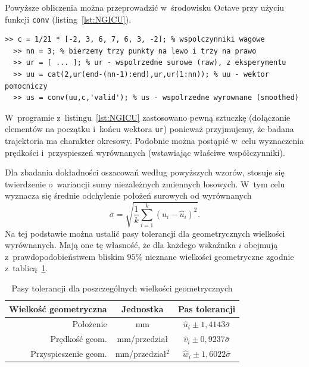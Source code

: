 \documentclass[paper=a4,DIV=12]{tmmlab}
\begin{document}
Powyższe obliczenia można przeprowadzić w~środowisku Octave przy użyciu funkcji
\lstinline{conv} (listing~\ref{lst:NGICU}).
\begin{lstlisting}[caption={Wyrównywanie współrzędnych w~programie Octave},label={lst:NGICU}]
  >> c = 1/21 * [-2, 3, 6, 7, 6, 3, -2]; % wspolczynniki wagowe
  >> nn = 3; % bierzemy trzy punkty na lewo i trzy na prawo
  >> ur = [ ... ]; % ur - wspolrzedne surowe (raw), z eksperymentu
  >> uu = cat(2,ur(end-(nn-1):end),ur,ur(1:nn)); % uu - wektor pomocniczy
  >> us = conv(uu,c,'valid'); % us - wspolrzedne wyrownane (smoothed)
\end{lstlisting}
W~programie z~listingu~\ref{lst:NGICU} zastosowano pewną sztuczkę
(dołączanie elementów na początku i~końcu wektora \lstinline{ur}) ponieważ
przyjmujemy, że badana trajektoria ma charakter okresowy. Podobnie można
postąpić w~celu wyznaczenia prędkości i~przyspieszeń wyrównanych (wstawiając
właściwe współczynniki).

Dla zbadania dokładności oszacowań według powyższych wzorów, stosuje się
twierdzenie o~wariancji sumy niezależnych zmiennych losowych. W~tym celu
wyznacza się średnie odchylenie położeń surowych od wyrównanych
\begin{equation}
  \bar{\sigma} = {\sqrt{\frac{1}{k} \sum_{i=1}^{k}{\left(u_i - \hat{u}_i\right)^2}}}.
  \label{eq:7Q65O}
\end{equation}
Na tej podstawie można ustalić pasy tolerancji dla geometrycznych wielkości
wyrównanych. Mają one tę własność, że dla każdego wskaźnika $i$ obejmują
z~prawdopodobieństwem bliskim $95\%$  nieznane wielkości geometryczne zgodnie
z~tablicą~\ref{tab:IKYIL}.
\begin{table}[htbp]
  \caption{Pasy tolerancji dla poszczególnych wielkości geometrycznych}
  \label{tab:IKYIL}
  \centering
  \begin{tabular}{|r|c|c|}
    \hline
    Wielkość geometryczna & Jednostka     & Pas tolerancji \\ \hline\hline
    Położenie             & mm            & $\hat{u}_i \pm 1,4143\bar{\sigma} $ \\ \hline
    Prędkość geom.        & mm/przedział  & $\hat{v}_i \pm 0,9237\bar{\sigma} $ \\ \hline
    Przyspieszenie geom.  & mm/przedział$^2$ & $\hat{w}_i \pm 1,6022\bar{\sigma} $ \\ \hline
  \end{tabular}
\end{table}
\end{document}
